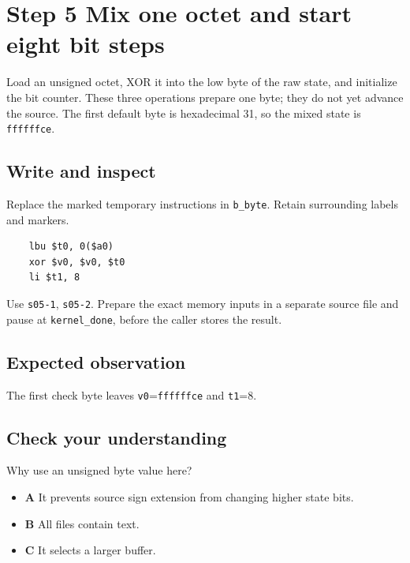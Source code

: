 \section{Step 5 Mix one octet and start eight bit steps}\label{crc-s05}

Load an unsigned octet, XOR it into the low byte of the raw state, and initialize the bit counter. These three operations prepare one byte; they do not yet advance the source. The first default byte is hexadecimal 31, so the mixed state is \texttt{ffffffce}.

\subsection{Write and inspect}
Replace the marked temporary instructions in \texttt{b\_byte}. Retain surrounding labels and markers.

\begin{verbatim}
    lbu $t0, 0($a0)
    xor $v0, $v0, $t0
    li $t1, 8
\end{verbatim}

Use \texttt{s05-1}, \texttt{s05-2}. Prepare the exact memory inputs in a separate source file and pause at \texttt{kernel\_done}, before the caller stores the result.

\subsection{Expected observation}
The first check byte leaves \texttt{v0}=\texttt{ffffffce} and \texttt{t1}=8.

\subsection{Check your understanding}
Why use an unsigned byte value here?

\begin{itemize}
\item \textbf{A} It prevents source sign extension from changing higher state bits.
\item \textbf{B} All files contain text.
\item \textbf{C} It selects a larger buffer.
\end{itemize}
